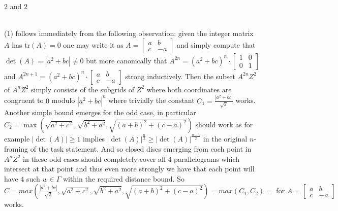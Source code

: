 $\boxed{2}$ and $\boxed{2}$

 \\
(1) follows immediately from the following observation: given the integer matrix $A$ has $\text{tr}(A)=0$ one may write it as $A=\begin{bmatrix} a & b \\ c & -a \end{bmatrix}$ and simply compute that $\det(A)=|a^2+bc|\neq 0$ but more canonically that $A^{2n}=(a^2+bc)^n \cdot \begin{bmatrix} 1 & 0 \\ 0 & 1 \end{bmatrix}$ and $A^{2n+1}=(a^2+bc)^n \cdot \begin{bmatrix} a & b \\ c & -a \end{bmatrix}$ strong inductively. Then the subset $A^{2n}Z^2$ of $A^nZ^2$ simply consists of the subgrids of $Z^2$ where both coordinates are congruent to $0$ modulo $|a^2+bc|^n$ where trivially the constant $C_1=\frac{|a^2+bc|}{\sqrt{2}}$ works. Another simple bound emerges for the odd case, in particular $C_2=\max(\sqrt{a^2+c^2},\sqrt{b^2+a^2},\sqrt{(a+b)^2+(c-a)^2})$ should work as for example $|\det(A)|\ge 1$ implies $|\det(A)|^{\frac{n}{2}}\ge|\det(A)|^{\frac{n-1}{2}}$ in the original $n$-framing of the task statement. And so closed discs emerging from each point in $A^nZ^2$ in these odd cases should completely cover all $4$ parallelograms which intersect at that point and thus even more strongly we have that each point will have $4$ such $w \in \Gamma$ within the required distance bound. So $\boxed{C=max\left( \frac{|a^2+bc|}{\sqrt{2}},\sqrt{a^2+c^2},\sqrt{b^2+a^2},\sqrt{(a+b)^2+(c-a)^2} \right)=max(C_1,C_2)=\text{ for }A=\begin{bmatrix} a & b \\ c & -a \end{bmatrix}}$ works.

